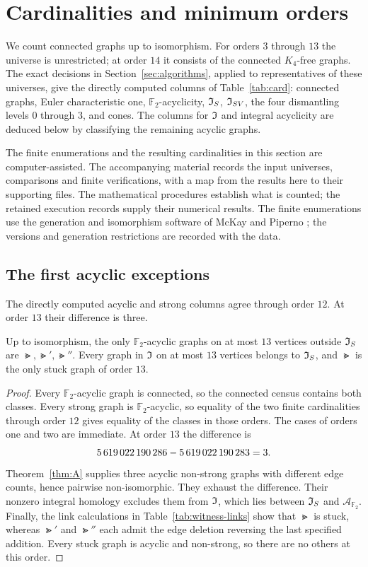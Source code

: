 \section{Cardinalities and minimum orders}\label{sec:searches}\label{sec:table}

We count connected graphs up to isomorphism. For orders $3$ through
$13$ the universe is unrestricted; at order $14$ it consists of the
connected $K_4$-free graphs. The exact decisions in
Section~\ref{sec:algorithms}, applied to representatives of these
universes, give the directly computed columns of
Table~\ref{tab:card}: connected graphs, Euler characteristic one,
$\mathbb F_2$-acyclicity, $\mathfrak I_S$, $\mathfrak I_{SV}$, the four dismantling levels
$0$ through $3$, and cones. The columns for $\mathfrak I$ and integral
acyclicity are deduced below by classifying the remaining acyclic
graphs.

The finite enumerations and the resulting cardinalities in this
section are computer-assisted. The accompanying material records
the input universes, comparisons and finite verifications, with a map
from the results here to their supporting files.
The mathematical procedures establish what is counted; the retained
execution records supply their numerical results. The finite enumerations
use the generation and isomorphism software of McKay and Piperno
\cite{McKayPiperno2014}; the versions and generation restrictions are
recorded with the data.

\subsection{The first acyclic exceptions}

The directly computed acyclic and strong columns agree through order
$12$. At order $13$ their difference is three. 

\begin{theorem}\label{thm:classification13}
Up to isomorphism, the only $\mathbb F_2$-acyclic graphs on at most
$13$ vertices outside $\mathfrak I_S$ are $\Gt,\Gt',\Gt''$. Every graph in
$\mathfrak I$ on at most $13$ vertices belongs to $\mathfrak I_S$, and $\Gt$ is the
only stuck graph of order $13$.
\end{theorem}
\begin{proof}
Every $\mathbb F_2$-acyclic graph is connected, so the connected census
contains both classes. Every strong graph is $\mathbb F_2$-acyclic, so equality of the two
finite cardinalities through order $12$ gives equality of the classes
in those orders. The cases of orders one and two are immediate.
At order $13$ the difference is
\[
 \num{5619022190286}-\num{5619022190283}=3.
\]
Theorem~\ref{thm:A} supplies three acyclic non-strong graphs with
different edge counts, hence pairwise non-isomorphic. They exhaust
the difference. Their nonzero integral homology excludes them from
$\mathfrak I$, which lies between $\mathfrak I_S$ and $\mathcal A_{\mathbb F_2}$.
Finally, the link calculations in Table~\ref{tab:witness-links}
show that $\Gt$ is stuck, whereas $\Gt'$ and $\Gt''$ each admit the
edge deletion reversing the last specified addition. Every stuck graph
is acyclic and non-strong, so there are no others at this order.
\end{proof}

